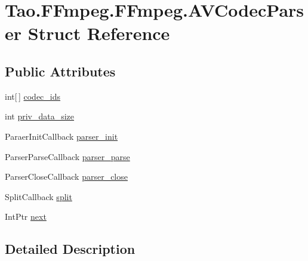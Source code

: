 \hypertarget{struct_tao_1_1_f_fmpeg_1_1_f_fmpeg_1_1_a_v_codec_parser}{
\section{Tao.FFmpeg.FFmpeg.AVCodecParser Struct Reference}
\label{struct_tao_1_1_f_fmpeg_1_1_f_fmpeg_1_1_a_v_codec_parser}
}
\subsection*{Public Attributes}
\begin{DoxyCompactItemize}
\item 
int\mbox{[}$\,$\mbox{]} \hyperlink{struct_tao_1_1_f_fmpeg_1_1_f_fmpeg_1_1_a_v_codec_parser_a77d17a2f483d00e92071a97282008a1d}{codec\_\-ids}
\item 
int \hyperlink{struct_tao_1_1_f_fmpeg_1_1_f_fmpeg_1_1_a_v_codec_parser_afdadc131385833ec7c18f9590354f7a1}{priv\_\-data\_\-size}
\item 
ParaerInitCallback \hyperlink{struct_tao_1_1_f_fmpeg_1_1_f_fmpeg_1_1_a_v_codec_parser_a2c31d25feb0402bfd0a0dd3a66b190ab}{parser\_\-init}
\item 
ParserParseCallback \hyperlink{struct_tao_1_1_f_fmpeg_1_1_f_fmpeg_1_1_a_v_codec_parser_a135cf4d2ed1301ee820f43201dc1b3d9}{parser\_\-parse}
\item 
ParserCloseCallback \hyperlink{struct_tao_1_1_f_fmpeg_1_1_f_fmpeg_1_1_a_v_codec_parser_a5a053c7777e45efcfb5f039542954e0e}{parser\_\-close}
\item 
SplitCallback \hyperlink{struct_tao_1_1_f_fmpeg_1_1_f_fmpeg_1_1_a_v_codec_parser_a531aad23139c0236b67ae76e7399da93}{split}
\item 
IntPtr \hyperlink{struct_tao_1_1_f_fmpeg_1_1_f_fmpeg_1_1_a_v_codec_parser_ac6bc4b5b6f9e7655e4641b03fc408a61}{next}
\end{DoxyCompactItemize}


\subsection{Detailed Description}


